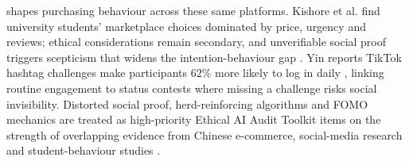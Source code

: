 \documentclass[11pt]{article}
\begin{document}
shapes purchasing behaviour across these same platforms. Kishore et al. find university students' marketplace choices dominated by price, urgency and reviews; ethical considerations remain secondary, and unverifiable social proof triggers scepticism that widens the intention-behaviour gap \parencites[2]{4245543}[4]{4245543}. Yin reports TikTok hashtag challenges make participants $62\%$ more likely to log in daily \parencites[3]{7154741}, linking routine engagement to status contests where missing a challenge risks social invisibility. Distorted social proof, herd-reinforcing algorithms and FOMO mechanics are treated as high-priority Ethical AI Audit Toolkit items on the strength of overlapping evidence from Chinese e-commerce, social-media research and student-behaviour studies \parencites[13]{7160486}[2]{3303310}[2]{4245543}[3]{7154741}.
\end{document}
